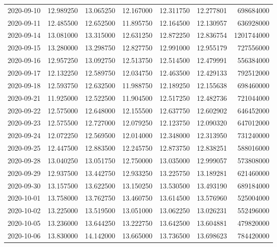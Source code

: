 \begin{tabular}{lrrrrrr}
2020-09-10 &   12.989250 &   13.065250 &   12.167000 &   12.311750 &   12.277801 &   698684000 \\
2020-09-11 &   12.485500 &   12.652500 &   11.895750 &   12.164500 &   12.130957 &   636928000 \\
2020-09-14 &   13.081000 &   13.315000 &   12.631250 &   12.872250 &   12.836754 &  1201744000 \\
2020-09-15 &   13.280000 &   13.298750 &   12.827750 &   12.991000 &   12.955179 &   727556000 \\
2020-09-16 &   12.957250 &   13.092750 &   12.513750 &   12.514500 &   12.479991 &   556384000 \\
2020-09-17 &   12.132250 &   12.589750 &   12.034750 &   12.463500 &   12.429133 &   792512000 \\
2020-09-18 &   12.593750 &   12.632500 &   11.988750 &   12.189250 &   12.155638 &   698460000 \\
2020-09-21 &   11.925000 &   12.522500 &   11.904500 &   12.517250 &   12.482736 &   721044000 \\
2020-09-22 &   12.575000 &   12.648000 &   12.155500 &   12.637750 &   12.602902 &   646452000 \\
2020-09-23 &   12.575500 &   12.727000 &   12.079250 &   12.123750 &   12.090320 &   647012000 \\
2020-09-24 &   12.072250 &   12.569500 &   12.014000 &   12.348000 &   12.313950 &   731240000 \\
2020-09-25 &   12.447500 &   12.883500 &   12.245750 &   12.873750 &   12.838251 &   588016000 \\
2020-09-28 &   13.040250 &   13.051750 &   12.750000 &   13.035000 &   12.999057 &   573808000 \\
2020-09-29 &   12.937500 &   13.442750 &   12.933250 &   13.225750 &   13.189281 &   621460000 \\
2020-09-30 &   13.157500 &   13.622500 &   13.150250 &   13.530500 &   13.493190 &   689184000 \\
2020-10-01 &   13.758000 &   13.762750 &   13.460750 &   13.614500 &   13.576960 &   525004000 \\
2020-10-02 &   13.225000 &   13.519500 &   13.051000 &   13.062250 &   13.026231 &   552496000 \\
2020-10-05 &   13.236000 &   13.644250 &   13.222750 &   13.642500 &   13.604881 &   479820000 \\
2020-10-06 &   13.830000 &   14.142000 &   13.665000 &   13.736500 &   13.698623 &   784420000 \\

\end{tabular}
